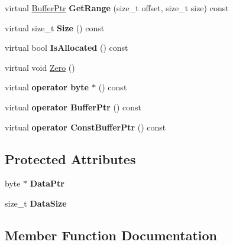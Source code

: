 \begin{DoxyCompactItemize}
virtual \hyperlink{class_gost_crypt_1_1_buffer_ptr}{Buffer\+Ptr} {\bfseries Get\+Range} (size\+\_\+t offset, size\+\_\+t size) const
\item 
\mbox{\label{class_gost_crypt_1_1_buffer_a626bf67f386602fd624142571b0821ee}} 
virtual size\+\_\+t {\bfseries Size} () const
\item 
\mbox{\label{class_gost_crypt_1_1_buffer_ab31f3d544395c080cb1b8f70d379e543}} 
virtual bool {\bfseries Is\+Allocated} () const
\item 
virtual void \hyperlink{class_gost_crypt_1_1_buffer_ac878b08ad614264efcf6a2fc11fc83b5}{Zero} ()
\item 
\mbox{\label{class_gost_crypt_1_1_buffer_a9a6d941c2ff15351c4a4d54fabd72d1d}} 
virtual {\bfseries operator byte $\ast$} () const
\item 
\mbox{\label{class_gost_crypt_1_1_buffer_a451c44cef35c793011b0c686cbe37cda}} 
virtual {\bfseries operator Buffer\+Ptr} () const
\item 
\mbox{\label{class_gost_crypt_1_1_buffer_a7fee8bd35b05b0bae5b18943cd52182c}} 
virtual {\bfseries operator Const\+Buffer\+Ptr} () const
\end{DoxyCompactItemize}
\subsection*{Protected Attributes}
\begin{DoxyCompactItemize}
\item 
\mbox{\label{class_gost_crypt_1_1_buffer_a40bdfea708874b74ea307c2ff35a9bde}} 
byte $\ast$ {\bfseries Data\+Ptr}
\item 
\mbox{\label{class_gost_crypt_1_1_buffer_ae015d1eb507613791cc5fb5e6fedf289}} 
size\+\_\+t {\bfseries Data\+Size}
\end{DoxyCompactItemize}


\subsection{Member Function Documentation}
\mbox{\label{class_gost_crypt_1_1_buffer_aa1416f36bf2d162cd6415989ca1a66d0}} 

